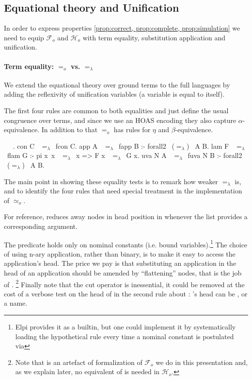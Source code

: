 \documentclass[sigconf,natbib=false,review]{acmart}
\newcommand{\EqualRel}{\ensuremath{=}}
\newcommand{\UnifRel}{\ensuremath{\simeq}}
\newcommand{\Uo}{\ensuremath{\UnifRel_o}\xspace}
\newcommand{\Eo}{\ensuremath{\EqualRel_o}\xspace}
\newcommand{\Ee}{\ensuremath{\EqualRel_\lambda}\xspace}
\newcommand{\Fo}{\ensuremath{\mathcal{F}_{\!o}\xspace}} %
\newcommand{\Ho}{\ensuremath{\mathcal{H}_o}\xspace}
\begin{document}
\subsection{Equational theory and Unification}

In order to express properties \ref{prop:correct, prop:complete, prop:simulation}
we need to equip \Fo{} and \Ho with term equality,
substitution application and unification.

\paragraph{Term equality: \Eo vs. \Ee} We extend the equational theory
over ground terms to the full languages by adding the reflexivity of
unification variables (a variable is equal to itself).

The first four rules are common to both equalities
and just define the usual congruence over terms, and since
we use an HOAS encoding they also capture $\alpha$-equivalence.
In addition to that \Eo has rules for $\eta$ and $\beta$-equivalence.



\begin{elpicode}
  ~ \PYG{n+nf}{(\Ee)} ~.
  con C ~\Ee~fcon C.
  app A ~\Ee~fapp B :- forall2 ~(\Ee)~ A B.
  lam F ~\Ee~flam G :- pi x\ x ~\Ee~x => F x ~\Ee~G x.
  uva N A ~\Ee~fuva N B :- forall2 ~(\Ee)~ A B.
\end{elpicode}

\noindent
The main point in showing these equality tests is to remark how weaker \Ee is,
and to identify the four rules that need special treatment in
the implementation of \Uo.

For reference,  reduces away  nodes in head
position in  whenever the list  provides a corresponding
argument.



\noindent
The  predicate holds only on nominal constants (i.e. bound
variables).\footnote{Elpi provides it as a builtin, but one could implement it by
systematically loading the hypothetical rule  every time
a nominal constant is postulated via }
The choice of using n-ary application, rather than binary, is to make it
easy to access the application's head. The price we pay is that substituting
an application in the head of an application should be amended by
``flattening''  nodes, that is the job of .
\footnote{Note that  is an artefact of formalization of \Fo{}
we do in this presentation and, as we explain later,
no equivalent of  is needed in \Ho.}
Finally note that the cut operator is inessential, it could be
removed at the cost of a verbose test on the head of 
in the second rule about : 's head
can be ,  or a name.
\end{document}
